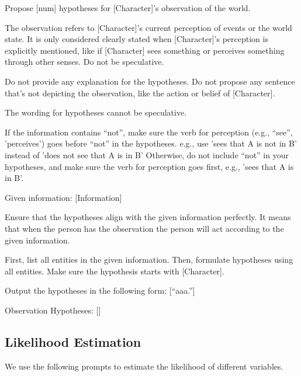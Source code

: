 \begin{tcolorbox}[
    breakable,
    colframe=blue!40!black,
    colback=blue!10,
    coltitle=white,
    fonttitle=\bfseries,
    title=Sampling observations,
    colbacktitle=blue!40!black
]
Propose [num] hypotheses for [Character]'s observation of the world.

The observation refers to [Character]'s current perception of events or the world state. It is only considered clearly stated when [Character]'s perception is explicitly mentioned, like if [Character] sees something or perceives something through other senses. Do not be speculative.

Do not provide any explanation for the hypotheses. Do not propose any sentence that's not depicting the observation, like the action or belief of [Character].

The wording for hypotheses cannot be speculative.

If the information contains ``not'', make sure the verb for perception (e.g., ``see'', 'perceives') goes before ``not'' in the hypotheses. e.g., use 'sees that A is not in B' instead of 'does not see that A is in B'
Otherwise, do not include ``not'' in your hypotheses, and make sure the verb for perception goes first, e.g., 'sees that A is in B'.

Given information: [Information]

Ensure that the hypotheses align with the given information perfectly. It means that when the person has the observation the person will act according to the given information.

First, list all entities in the given information. Then, formulate hypotheses using all entities. Make sure the hypothesis starts with [Character].

Output the hypotheses in the following form: [``aaa.''] \newline

Observation Hypotheses: []
\end{tcolorbox}



\subsection{Likelihood Estimation} 
We use the following prompts to estimate the likelihood of different variables. 

